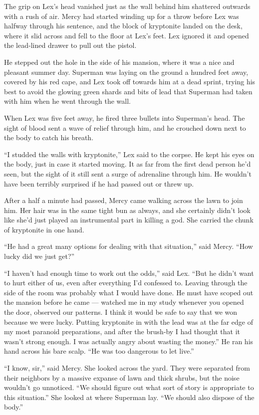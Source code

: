 The grip on Lex's head vanished just as the wall behind him shattered
outwards with a rush of air. Mercy had started winding up for a throw
before Lex was halfway through his sentence, and the block of kryptonite
landed on the desk, where it slid across and fell to the floor at Lex's
feet. Lex ignored it and opened the lead‐lined drawer to pull out the
pistol.

He stepped out the hole in the side of his mansion, where it was a nice
and pleasant summer day. Superman was laying on the ground a hundred
feet away, covered by his red cape, and Lex took off towards him at a
dead sprint, trying his best to avoid the glowing green shards and bits
of lead that Superman had taken with him when he went through the wall.

When Lex was five feet away, he fired three bullets into Superman's
head. The sight of blood sent a wave of relief through him, and he
crouched down next to the body to catch his breath.

``I studded the walls with kryptonite,'' Lex said to the corpse. He kept
his eyes on the body, just in case it started moving. It as far from the
first dead person he'd seen, but the sight of it still sent a surge of
adrenaline through him. He wouldn't have been terribly surprised if he
had passed out or threw up.

After a half a minute had passed, Mercy came walking across the lawn to
join him. Her hair was in the same tight bun as always, and she
certainly didn't look like she'd just played an instrumental part in
killing a god. She carried the chunk of kryptonite in one hand.

``He had a great many options for dealing with that situation,'' said
Mercy. ``How lucky did we just get?''

``I haven't had enough time to work out the odds,'' said Lex. ``But he
didn't want to hurt either of us, even after everything I'd confessed
to. Leaving through the side of the room was probably what I would have
done. He must have scoped out the mansion before he came --- watched me
in my study whenever you opened the door, observed our patterns. I think
it would be safe to say that we won because we were lucky. Putting
kryptonite in with the lead was at the far edge of my most paranoid
preparations, and after the brush‐by I had thought that it wasn't strong
enough. I was actually angry about wasting the money.'' He ran his hand
across his bare scalp. ``He was too dangerous to let live.''

``I know, sir,'' said Mercy. She looked across the yard. They were
separated from their neighbors by a massive expanse of lawn and thick
shrubs, but the noise wouldn't go unnoticed. ``We should figure out what
sort of story is appropriate to this situation.'' She looked at where
Superman lay. ``We should also dispose of the body.''

